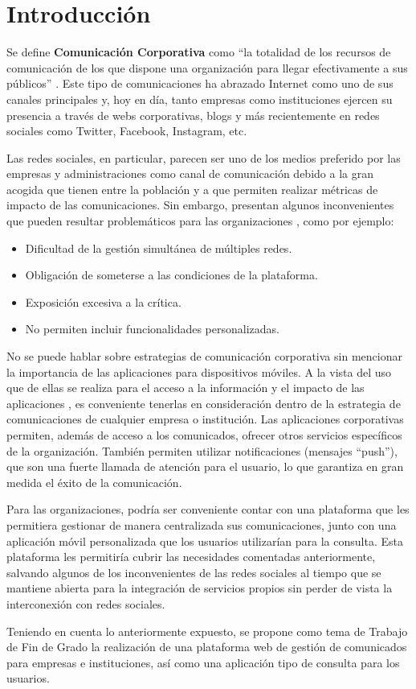 \section{Introducción}

Se define \textbf{Comunicación Corporativa} como ``la totalidad de los recursos de comunicación de los que dispone una organización para llegar efectivamente a sus públicos'' \cite{riel_2001}. Este tipo de comunicaciones ha abrazado Internet como uno de sus canales principales y, hoy en día, tanto empresas como instituciones ejercen su presencia a través de webs corporativas, blogs y más recientemente en redes sociales como Twitter, Facebook, Instagram, etc.

Las redes sociales, en particular, parecen ser uno de los medios preferido por las empresas \cite{linkedin} y administraciones \cite{grande2015casos} como canal de comunicación debido a la gran acogida que tienen entre la población y a que permiten realizar métricas de impacto de las comunicaciones. Sin embargo, presentan algunos inconvenientes que pueden resultar problemáticos para las organizaciones \cite{nadaraja2013socialmediamarketing}, como por ejemplo:
\begin{itemize}
    \item Dificultad de la gestión simultánea de múltiples redes.
    \item Obligación de someterse a las condiciones de la plataforma.
    \item Exposición excesiva a la crítica.
    \item No permiten incluir funcionalidades personalizadas.
\end {itemize}

No se puede hablar sobre estrategias de comunicación corporativa sin mencionar la importancia de las aplicaciones para dispositivos móviles. A la vista del uso que de ellas se realiza para el acceso a la información y el impacto de las aplicaciones \cite{playstore} \cite{appstore}, es conveniente tenerlas en consideración dentro de la estrategia de comunicaciones de cualquier empresa o institución. Las aplicaciones corporativas permiten, además de acceso a los comunicados, ofrecer otros servicios específicos de la organización. También permiten utilizar notificaciones (mensajes ``push''), que son una fuerte llamada de atención para el usuario, lo que garantiza en gran medida el éxito de la comunicación.

Para las organizaciones, podría ser conveniente contar con una plataforma que les permitiera gestionar de manera centralizada sus comunicaciones, junto con una aplicación móvil personalizada que los usuarios utilizarían para la consulta. Esta plataforma les permitiría cubrir las necesidades comentadas anteriormente, salvando algunos de los inconvenientes de las redes sociales al tiempo que se mantiene abierta para la integración de servicios propios sin perder de vista la interconexión con redes sociales.

Teniendo en cuenta lo anteriormente expuesto, se propone como tema de Trabajo de Fin de Grado la realización de una plataforma web de gestión de comunicados para empresas e instituciones, así como una aplicación tipo de consulta para los usuarios.